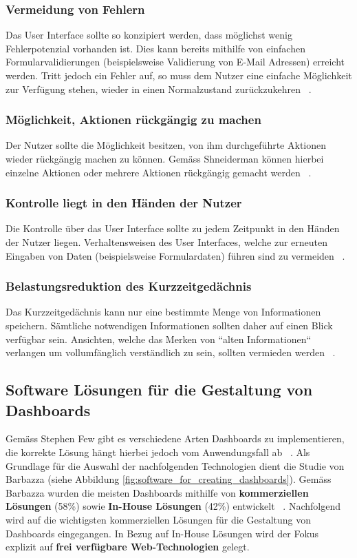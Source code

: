 \subsubsection{Vermeidung von Fehlern}
Das User Interface sollte so konzipiert werden, dass möglichst wenig Fehlerpotenzial vorhanden ist. Dies kann bereits mithilfe von einfachen Formularvalidierungen (beispielsweise Validierung von E-Mail Adressen) erreicht werden. Tritt jedoch ein Fehler auf, so muss dem Nutzer eine einfache Möglichkeit zur Verfügung stehen, wieder in einen Normalzustand zurückzukehren ~\citep{shneiderman_golden_rules}.

\subsubsection{Möglichkeit, Aktionen rückgängig zu machen}
Der Nutzer sollte die Möglichkeit besitzen, von ihm durchgeführte Aktionen wieder rückgängig machen zu können. Gemäss Shneiderman können hierbei einzelne Aktionen oder mehrere Aktionen rückgängig gemacht werden ~\citep{shneiderman_golden_rules}.

\subsubsection{Kontrolle liegt in den Händen der Nutzer}
Die Kontrolle über das User Interface sollte zu jedem Zeitpunkt in den Händen der Nutzer liegen. Verhaltensweisen des User Interfaces, welche zur erneuten Eingaben von Daten (beispielsweise Formulardaten) führen sind zu vermeiden ~\citep{shneiderman_golden_rules}.

\clearpage
\subsubsection{Belastungsreduktion des Kurzzeitgedächnis}
Das Kurzzeitgedächnis kann nur eine bestimmte Menge von Informationen speichern. Sämtliche notwendigen Informationen sollten daher auf einen Blick verfügbar sein. Ansichten, welche das Merken von ``alten Informationen`` verlangen um vollumfänglich verständlich zu sein, sollten vermieden werden ~\citep{shneiderman_golden_rules}.

\subsection{Software Lösungen für die Gestaltung von Dashboards}
Gemäss Stephen Few gibt es verschiedene Arten Dashboards zu implementieren, die korrekte Lösung hängt hierbei jedoch vom Anwendungsfall ab ~\citep[S. 34]{information_dashboard_design}. Als Grundlage für die Auswahl der nachfolgenden Technologien dient die Studie von Barbazza (siehe Abbildung \ref{fig:software_for_creating_dashboards}). Gemäss Barbazza wurden die meisten Dashboards mithilfe von \textbf{kommerziellen Lösungen} (58\%) sowie \textbf{In-House Lösungen} (42\%) entwickelt ~\cite[S. 9]{barbazza}. Nachfolgend wird auf die wichtigsten kommerziellen Lösungen für die Gestaltung von Dashboards eingegangen. In Bezug auf In-House Lösungen wird der Fokus explizit auf \textbf{frei verfügbare Web-Technologien} gelegt.

